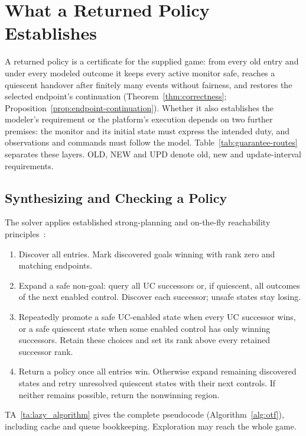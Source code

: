 \documentclass[acmsmall,screen,review,anonymous]{acmart}
\begin{document}


\section{What a Returned Policy Establishes}
\label{sec:interpretation-execution}
\label{sec:proof}
A returned policy is a certificate for the supplied game: from every old entry and under every modeled outcome it keeps every active monitor safe, reaches a quiescent handover after finitely many events without fairness, and restores the selected endpoint's continuation (Theorem~\ref{thm:correctness}; Proposition~\ref{prop:endpoint-continuation}). Whether it also establishes the modeler's requirement or the platform's execution depends on two further premises: the monitor and its initial state must express the intended duty, and observations and commands must follow the model. Table~\ref{tab:guarantee-routes} separates these layers. OLD, NEW and UPD denote old, new and update-interval requirements.



\subsection{Synthesizing and Checking a Policy}
\label{sec:algorithm}
The solver applies established strong-planning and on-the-fly reachability principles~\cite{Cimatti1998StrongPlanning,TripakisAltisen1999,CiolekDCS,CassezEtAl2005TimedGames}:
\begin{enumerate}
\item Discover all entries. Mark discovered goals winning with rank zero and matching endpoints.
\item Expand a safe non-goal: query all UC successors or, if quiescent, all outcomes of the next enabled control. Discover each successor; unsafe states stay losing.
\item Repeatedly promote a safe UC-enabled state when every UC successor wins, or a safe quiescent state when some enabled control has only winning successors. Retain these choices and set its rank above every retained successor rank.
\item Return a policy once all entries win. Otherwise expand remaining discovered states and retry unresolved quiescent states with their next controls. If neither remains possible, return the nonwinning region.
\end{enumerate}
TA~\ref{ta:lazy_algorithm} gives the complete pseudocode (Algorithm~\ref{alg:otf}), including cache and queue bookkeeping. Exploration may reach the whole game.
\end{document}
